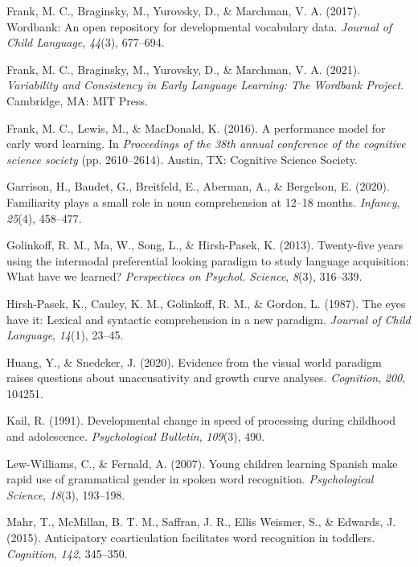 \documentclass[10pt, letterpaper]{article}
\begin{document}
\leavevmode\hypertarget{ref-Frank2016}{}%
Frank, M. C., Braginsky, M., Yurovsky, D., \& Marchman, V. A. (2017).
Wordbank: An open repository for developmental vocabulary data.
\emph{Journal of Child Language}, \emph{44}(3), 677--694.

\leavevmode\hypertarget{ref-frank2021}{}%
Frank, M. C., Braginsky, M., Yurovsky, D., \& Marchman, V. A. (2021).
\emph{Variability and Consistency in Early Language Learning: The
Wordbank Project}. Cambridge, MA: MIT Press.

\leavevmode\hypertarget{ref-frank2016b}{}%
Frank, M. C., Lewis, M., \& MacDonald, K. (2016). A performance model
for early word learning. In \emph{Proceedings of the 38th annual
conference of the cognitive science society} (pp. 2610--2614). Austin,
TX: Cognitive Science Society.

\leavevmode\hypertarget{ref-Garrison2020}{}%
Garrison, H., Baudet, G., Breitfeld, E., Aberman, A., \& Bergelson, E.
(2020). Familiarity plays a small role in noun comprehension at 12--18
months. \emph{Infancy}, \emph{25}(4), 458--477.

\leavevmode\hypertarget{ref-Golinkoff2013}{}%
Golinkoff, R. M., Ma, W., Song, L., \& Hirsh-Pasek, K. (2013).
Twenty-five years using the intermodal preferential looking paradigm to
study language acquisition: What have we learned? \emph{Perspectives on
Psychol. Science}, \emph{8}(3), 316--339.

\leavevmode\hypertarget{ref-Hirsh-Pasek1987}{}%
Hirsh-Pasek, K., Cauley, K. M., Golinkoff, R. M., \& Gordon, L. (1987).
The eyes have it: Lexical and syntactic comprehension in a new paradigm.
\emph{Journal of Child Language}, \emph{14}(1), 23--45.

\leavevmode\hypertarget{ref-Huang2020}{}%
Huang, Y., \& Snedeker, J. (2020). Evidence from the visual world
paradigm raises questions about unaccusativity and growth curve
analyses. \emph{Cognition}, \emph{200}, 104251.

\leavevmode\hypertarget{ref-kail1991}{}%
Kail, R. (1991). Developmental change in speed of processing during
childhood and adolescence. \emph{Psychological Bulletin}, \emph{109}(3),
490.

\leavevmode\hypertarget{ref-Lew-Williams2007}{}%
Lew-Williams, C., \& Fernald, A. (2007). Young children learning Spanish
make rapid use of grammatical gender in spoken word recognition.
\emph{Psychological Science}, \emph{18}(3), 193--198.

\leavevmode\hypertarget{ref-Mahr2015}{}%
Mahr, T., McMillan, B. T. M., Saffran, J. R., Ellis Weismer, S., \&
Edwards, J. (2015). Anticipatory coarticulation facilitates word
recognition in toddlers. \emph{Cognition}, \emph{142}, 345--350.
\end{document}
